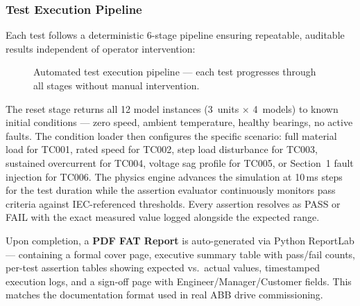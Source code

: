 \documentclass[9pt,a4paper,twocolumn,twoside]{tau-class/tau}
\begin{document}
\subsubsection{Test Execution Pipeline}

Each test follows a deterministic 6-stage pipeline ensuring repeatable, auditable results independent of operator intervention:

\begin{figure}[H]
\centering
\small
{}
\caption{Automated test execution pipeline — each test progresses through all stages without manual intervention.}
\label{fig:testpipeline}
\end{figure}

The reset stage returns all 12 model instances (3~units $\times$ 4~models) to known initial conditions — zero speed, ambient temperature, healthy bearings, no active faults. The condition loader then configures the specific scenario: full material load for TC001, rated speed for TC002, step load disturbance for TC003, sustained overcurrent for TC004, voltage sag profile for TC005, or Section~1 fault injection for TC006. The physics engine advances the simulation at 10\,ms steps for the test duration while the assertion evaluator continuously monitors pass criteria against IEC-referenced thresholds. Every assertion resolves as PASS or FAIL with the exact measured value logged alongside the expected range.

Upon completion, a \textbf{PDF FAT Report} is auto-generated via Python ReportLab — containing a formal cover page, executive summary table with pass/fail counts, per-test assertion tables showing expected vs.\ actual values, timestamped execution logs, and a sign-off page with Engineer/Manager/Customer fields. This matches the documentation format used in real ABB drive commissioning.
\end{document}
